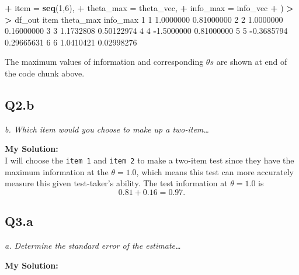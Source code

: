 \documentclass[
]{article}
\newenvironment{Shaded}{\begin{snugshade}}{\end{snugshade}}
\newcommand{\AttributeTok}[1]{\textcolor[rgb]{0.13,0.29,0.53}{#1}}
\newcommand{\DecValTok}[1]{\textcolor[rgb]{0.00,0.00,0.81}{#1}}
\newcommand{\ErrorTok}[1]{\textcolor[rgb]{0.64,0.00,0.00}{\textbf{#1}}}
\newcommand{\FloatTok}[1]{\textcolor[rgb]{0.00,0.00,0.81}{#1}}
\newcommand{\FunctionTok}[1]{\textcolor[rgb]{0.13,0.29,0.53}{\textbf{#1}}}
\newcommand{\NormalTok}[1]{#1}
\newcommand{\SpecialCharTok}[1]{\textcolor[rgb]{0.81,0.36,0.00}{\textbf{#1}}}
\begin{document}
\begin{Shaded}
\begin{Highlighting}[]
\SpecialCharTok{+}   \AttributeTok{item =} \FunctionTok{seq}\NormalTok{(}\DecValTok{1}\NormalTok{,}\DecValTok{6}\NormalTok{),}
\SpecialCharTok{+}   \AttributeTok{theta\_max =}\NormalTok{ theta\_vec,}
\SpecialCharTok{+}   \AttributeTok{info\_max =}\NormalTok{ info\_vec}
\SpecialCharTok{+}\NormalTok{ )}
\SpecialCharTok{\textgreater{}} 
\ErrorTok{\textgreater{}}\NormalTok{ df\_out}
\NormalTok{  item  theta\_max   info\_max}
\DecValTok{1}    \DecValTok{1}  \FloatTok{1.0000000} \FloatTok{0.81000000}
\DecValTok{2}    \DecValTok{2}  \FloatTok{1.0000000} \FloatTok{0.16000000}
\DecValTok{3}    \DecValTok{3}  \FloatTok{1.1732808} \FloatTok{0.50122974}
\DecValTok{4}    \DecValTok{4} \SpecialCharTok{{-}}\FloatTok{1.5000000} \FloatTok{0.81000000}
\DecValTok{5}    \DecValTok{5} \SpecialCharTok{{-}}\FloatTok{0.3685794} \FloatTok{0.29665631}
\DecValTok{6}    \DecValTok{6}  \FloatTok{1.0410421} \FloatTok{0.02998276}
\end{Highlighting}
\end{Shaded}

The maximum values of information and corresponding \(\theta s\) are
shown at end of the code chunk above.

\hypertarget{q2.b}{%
\subsection{Q2.b}\label{q2.b}}

\emph{b. Which item would you choose to make up a two-item\ldots{}}

\textbf{My Solution:}\\
I will choose the \texttt{item\ 1} and \texttt{item\ 2} to make a
two-item test since they have the maximum information at the
\(\theta = 1.0\), which means this test can more accurately measure this
given test-taker's ability. The test information at \(\theta = 1.0\) is
\[0.81+0.16=0.97.\]

\hypertarget{q3.a}{%
\subsection{Q3.a}\label{q3.a}}

\emph{a. Determine the standard error of the estimate\ldots{}}

\textbf{My Solution:}
\end{document}
